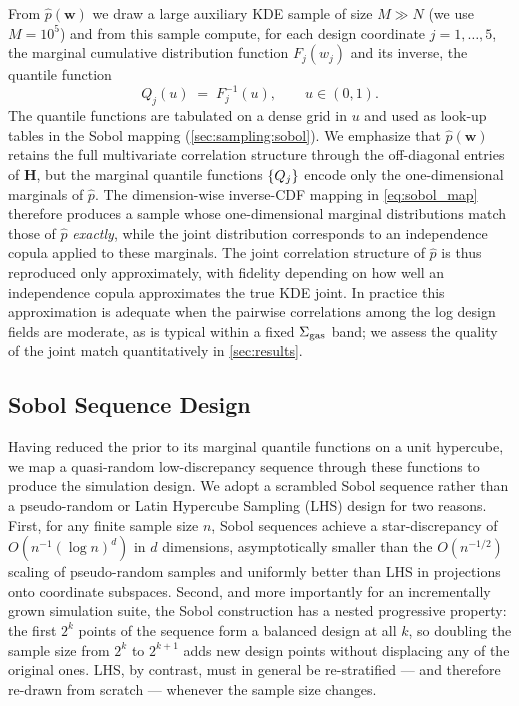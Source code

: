 From $\hat{p}(\bm{w})$ we draw a large auxiliary KDE sample of size
$M \gg N$ (we use $M = 10^{5}$) and from this sample compute, for each
design coordinate $j = 1,\ldots,5$, the marginal cumulative distribution
function $F_j(w_j)$ and its inverse, the quantile function
\begin{equation}
Q_j(u) \;=\; F_j^{-1}(u), \qquad u \in (0,1).
\label{eq:quantile_function}
\end{equation}
The quantile functions are tabulated on a dense grid in $u$ and used as
look-up tables in the Sobol mapping (\autoref{sec:sampling:sobol}).
We emphasize that $\hat{p}(\bm{w})$ retains the full multivariate
correlation structure through the off-diagonal entries of $\bm{H}$,
but the marginal quantile functions $\left\{{Q_j}\right\}$ encode only the
one-dimensional marginals of $\hat{p}$. The dimension-wise
inverse-CDF mapping in \autoref{eq:sobol_map} therefore produces a
sample whose one-dimensional marginal distributions match those of
$\hat{p}$ \emph{exactly}, while the joint distribution corresponds to
an independence copula applied to these marginals. The joint
correlation structure of $\hat{p}$ is thus reproduced only
approximately, with fidelity depending on how well an independence
copula approximates the true KDE joint. In practice this approximation
is adequate when the pairwise correlations among the log design fields
are moderate, as is typical within a fixed $\Sigma_{\rm gas}$ band; we assess the
quality of the joint match quantitatively in \autoref{sec:results}.

\subsection{Sobol Sequence Design}
\label{sec:sampling:sobol}

Having reduced the prior to its marginal quantile functions on a unit
hypercube, we map a quasi-random low-discrepancy sequence through these
functions to produce the simulation design. We adopt a scrambled Sobol
sequence \citep{Sobol1967,Owen1998} rather than a pseudo-random or Latin
Hypercube Sampling (LHS) design for two reasons. First, for any finite
sample size $n$, Sobol sequences achieve a star-discrepancy of
$O(n^{-1}(\log n)^{d})$ in $d$ dimensions, asymptotically smaller than
the $O(n^{-1/2})$ scaling of pseudo-random samples and uniformly better
than LHS in projections onto coordinate subspaces. Second, and more
importantly for an incrementally grown simulation suite, the Sobol
construction has a nested progressive property: the first $2^{k}$ points
of the sequence form a balanced design at all $k$, so doubling the sample
size from $2^{k}$ to $2^{k+1}$ adds new design points without displacing
any of the original ones. LHS, by contrast, must in general be
re-stratified — and therefore re-drawn from scratch — whenever the
sample size changes.

